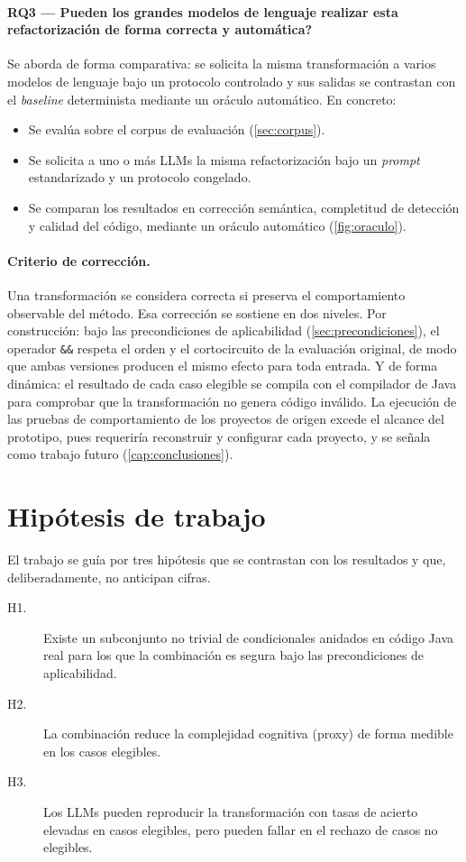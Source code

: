 \paragraph{RQ3 — \textquestiondown{}Pueden los grandes modelos de lenguaje realizar esta refactorización de forma correcta y automática?}
Se aborda de forma comparativa: se solicita la misma transformación a varios
modelos de lenguaje bajo un protocolo controlado y sus salidas se contrastan con
el \emph{baseline} determinista mediante un oráculo automático. En concreto:
\begin{itemize}
  \item Se evalúa sobre el corpus de evaluación (\autoref{sec:corpus}).
  \item Se solicita a uno o más LLMs la misma refactorización bajo un
  \emph{prompt} estandarizado y un protocolo congelado.
  \item Se comparan los resultados en corrección semántica, completitud de
  detección y calidad del código, mediante un oráculo automático
  (\autoref{fig:oraculo}).
\end{itemize}

\paragraph{Criterio de corrección.}
Una transformación se considera correcta si preserva el comportamiento
observable del método. Esa corrección se sostiene en dos niveles. Por
construcción: bajo las precondiciones de aplicabilidad
(\autoref{sec:precondiciones}), el operador \lstinline|&&| respeta el orden y
el cortocircuito de la evaluación original, de modo que ambas versiones
producen el mismo efecto para toda entrada. Y de forma dinámica: el resultado
de cada caso elegible se compila con el compilador de Java para comprobar que
la transformación no genera código inválido. La ejecución de las pruebas de
comportamiento de los proyectos de origen excede el alcance del prototipo,
pues requeriría reconstruir y configurar cada proyecto, y se señala como
trabajo futuro (\autoref{cap:conclusiones}).

\section{Hipótesis de trabajo}
\label{sec:hipotesis}
El trabajo se guía por tres hipótesis que se contrastan con los resultados y
que, deliberadamente, no anticipan cifras.

\begin{description}
  \item[H1.] Existe un subconjunto no trivial de condicionales anidados en
  código Java real para los que la combinación es segura bajo las
  precondiciones de aplicabilidad.
  \item[H2.] La combinación reduce la complejidad cognitiva (proxy) de forma
  medible en los casos elegibles.
  \item[H3.] Los LLMs pueden reproducir la transformación con tasas de acierto
  elevadas en casos elegibles, pero pueden fallar en el rechazo de casos no
  elegibles.
\end{description}
